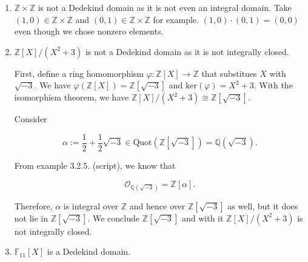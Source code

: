 \documentclass[a4paper]{article}
\theoremstyle{definition}
\begin{document}
\begin{enumerate}
    \item \(\mathbb{Z}\times\mathbb{Z}\) is not a Dedekind domain as it is not even an integral domain. Take \((1, 0) \in \mathbb{Z}\times\mathbb{Z}\) and \((0, 1) \in \mathbb{Z}\times\mathbb{Z}\) for example. \((1, 0) \cdot (0, 1) = (0, 0)\) even though we chose nonzero elements.
    \item \(\mathbb{Z}[X] / (X^2 + 3)\) is not a Dedekind domain as it is not integrally closed.

    First, define a ring homomorphism \(\varphi: \mathbb{Z}[X] \rightarrow \mathbb{Z}\) that substitues \(X\) with \(\sqrt{-3}\). We have \(\varphi(\mathbb{Z}[X]) = \mathbb{Z}[\sqrt{-3}]\) and \(\text{ker} (\varphi) = X^2 + 3\). With the isomorphism theorem, we have \(\mathbb{Z}[X] / (X^2 + 3) \cong \mathbb{Z}[\sqrt{-3}]\).

    Consider

    \begin{equation}
        \alpha := \frac{1}{2} + \frac{1}{2} \sqrt{-3} \in \text{Quot}(\mathbb{Z}[\sqrt{-3}]) = \mathbb{Q}(\sqrt{-3}) \text{.}
    \end{equation}

    From example 3.2.5. (script), we know that

    \begin{equation}
        \mathcal{O}_{\mathbb{Q}(\sqrt{-3})} = \mathbb{Z}[\alpha] \text{.}
    \end{equation}
    
    Therefore, \(\alpha\) is integral over \(\mathbb{Z}\) and hence over \(\mathbb{Z}[\sqrt{-3}]\) as well, but it does not lie in \(\mathbb{Z}[\sqrt{-3}]\). We conclude \(\mathbb{Z}[\sqrt{-3}]\) and with it \(\mathbb{Z}[X] / (X^2 + 3)\) is not integrally closed.
    \item \(\mathbb{F}_{11}[X]\) is a Dedekind domain.
    

\end{enumerate}
\end{document}
